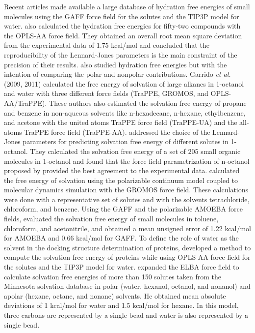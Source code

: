 Recent articles \cite{PMID:24928188,mobley2017} made available a large database of hydration free energies of small molecules using the GAFF force field for the
solutes and the TIP3P model for water.  also calculated the hydration free energies for fifty-two compounds with the OPLS-AA force field. They obtained an overall root mean square deviation from the experimental data of 1.75 kcal/mol and concluded that the reproducibility of the Lennard-Jones parameters is the main constraint of the precision of their results.  also studied hydration free energies but with the intention of comparing the polar and nonpolar contributions. Garrido \textit{et al.} (2009, 2011) calculated the free energy of solvation of large alkanes in 1-octanol and water with three different force fields (TraPPE, GROMOS, and OPLS-AA/TraPPE). These authors also estimated the solvation free energy of propane and benzene in non-aqueous solvents like n-hexadecane, n-hexane, ethylbenzene, and acetone with the united atoms TraPPE force field (TraPPE-UA) and the all-atoms TraPPE force field (TraPPE-AA).  addressed the choice of the Lennard-Jones parameters for predicting solvation free energy of different solutes in 1-octanol. They calculated the solvation free energy of a set of 205 small organic molecules in 1-octanol and found that the force field parametrization of n-octanol proposed by  provided the best agreement to the experimental data.  calculated the free energy of solvation using the polarizable continuum model coupled to molecular dynamics simulation with the GROMOS force field. These calculations were done with a representative set of solutes and with the solvents tetrachloride, chloroform, and benzene. Using the GAFF and the polarizable AMOEBA force fields,  evaluated the solvation free energy of small molecules in toluene, chloroform, and acetonitrile, and obtained a mean unsigned error of 1.22 kcal/mol for AMOEBA and 0.66 kcal/mol for GAFF. To define the role of water as the solvent in the docking structure determination of proteins,  developed a method to compute the solvation free energy of proteins while using OPLS-AA force field for the
solutes and the TIP3P model for water.  expanded the ELBA force field to calculate solvation free energies of more than 150 solutes taken from the Minnesota solvation
database in polar (water, hexanol, octanol, and nonanol) and apolar (hexane, octane, and nonane) solvents. He obtained mean absolute deviations of 1 kcal/mol for water and 1.5 kcal/mol for hexane. In this model, three carbons are represented by a single bead and water is also represented by a single bead. 

